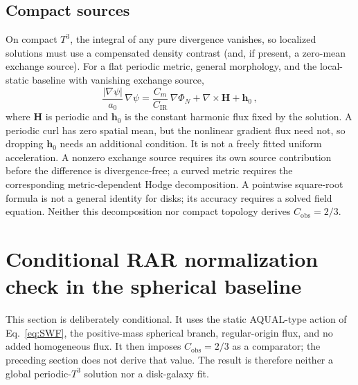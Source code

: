 \documentclass[aps,prd,reprint,superscriptaddress,nofootinbib,floatfix,showkeys]{revtex4-2}
\newcommand{\Tthree}{T^{3}}
\newcommand{\Cobs}{C_{\mathrm{obs}}}
\newcommand{\Cm}{C_{m}}
\newcommand{\CIR}{C_{\mathrm{IR}}}
\newcommand{\azero}{a_{0}}
\begin{document}
\subsection{Compact sources}

On compact \(\Tthree\), the integral of any pure divergence vanishes, so
localized solutions must use a compensated density contrast (and, if present,
a zero-mean exchange source).  For a flat periodic metric, general morphology,
and the local-static baseline with vanishing exchange source,
\begin{equation}
  \frac{|\nabla\psi|}{\azero}\,\nabla\psi
  = \frac{\Cm}{\CIR}\,\nabla\Phi_{N} + \nabla\times\mathbf{H}
    + \mathbf{h}_0\,,
  \label{eq:curl}
\end{equation}
where \(\mathbf H\) is periodic and \(\mathbf h_0\) is the constant harmonic
flux fixed by the solution.  A periodic curl has zero spatial mean, but the
nonlinear gradient flux need not, so dropping \(\mathbf h_0\) needs an
additional condition.  It is not a freely fitted uniform acceleration.
A nonzero exchange source requires its own source contribution before the
difference is divergence-free; a curved metric requires the corresponding
metric-dependent Hodge decomposition. A pointwise square-root formula is not
a general identity for disks; its accuracy requires a solved field equation.
Neither this decomposition nor compact topology
derives \(\Cobs=2/3\).

\section{Conditional RAR normalization check in the spherical baseline}
\label{sec:rar}

This section is deliberately conditional.  It uses the static AQUAL-type
action of Eq.~\eqref{eq:SWF}, the positive-mass spherical branch, regular-origin
flux, and no added homogeneous flux.  It then imposes \(\Cobs=2/3\) as a
comparator; the preceding section does not derive that value.  The result is
therefore neither a global periodic-\(\Tthree\) solution nor a disk-galaxy fit.
\end{document}
